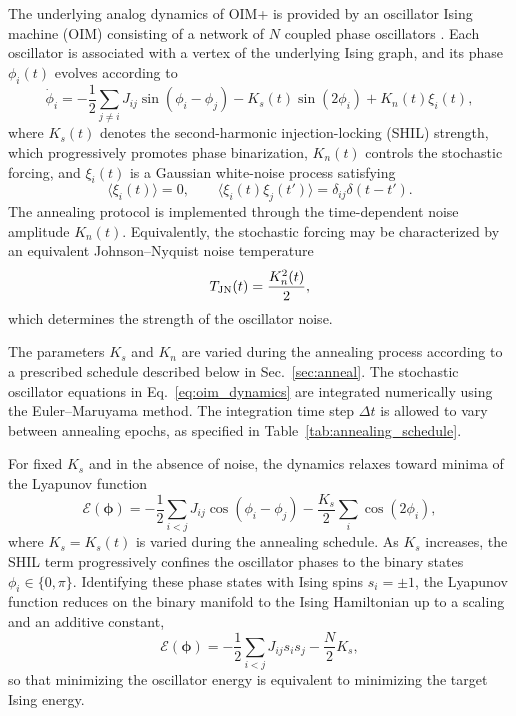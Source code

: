 \documentclass[
reprint,
amsmath,amssymb,
aps,
pre,
floatfix,
]{revtex4-2}
\begin{document}
The underlying analog dynamics of OIM+ is provided by an oscillator Ising machine (OIM) consisting of a network of $N$ coupled phase oscillators \cite{OIM,Neumann}. Each oscillator is associated with a vertex of the underlying Ising graph, and its phase $\phi_i(t)$ evolves according to
\begin{equation}
\dot{\phi}_i =
-
\frac{1}{2}\sum_{j\neq i}
J_{ij}
\sin(\phi_i-\phi_j)
-K_s(t)\sin(2\phi_i)
+K_n(t)\xi_i(t),
\label{eq:oim_dynamics}
\end{equation}
where $K_s(t)$ denotes the second-harmonic injection-locking (SHIL) strength, which progressively promotes phase binarization, $K_n(t)$ controls the stochastic forcing, and $\xi_i(t)$ is a Gaussian white-noise process satisfying
\begin{equation}
\langle \xi_i(t)\rangle =0,
\qquad
\langle \xi_i(t)\xi_j(t')\rangle=
\delta_{ij}\delta(t-t').
\end{equation}
The annealing protocol is implemented through the time-dependent noise amplitude $K_n(t)$. Equivalently, the stochastic forcing may be characterized by an
equivalent Johnson--Nyquist noise temperature
\begin{equation}
\label{eq:Tjn}
T_{\rm JN}(t)
=
\frac{K_n^2(t)}{2},
\end{equation}
which determines the strength of the oscillator noise.

The parameters $K_s$ and $K_n$ are varied during the annealing process according to a prescribed schedule described below in Sec.~\ref{sec:anneal}.
The stochastic oscillator equations in Eq.~\eqref{eq:oim_dynamics} are
integrated numerically using the Euler--Maruyama method.
The integration time step $\Delta t$ is allowed to vary between annealing
epochs, as specified in Table~\ref{tab:annealing_schedule}.

For fixed $K_s$ and in the absence of noise, the dynamics relaxes toward minima of the Lyapunov function
\begin{equation}
\mathcal{E}(\boldsymbol{\phi})
=
-\frac{1}{2}\sum_{i<j}
J_{ij}
\cos(\phi_i-\phi_j)
-\frac{K_s}{2}
\sum_i
\cos(2\phi_i),
\label{eq:lyapunov}
\end{equation}
where $K_s=K_s(t)$ is varied during the annealing schedule.
As $K_s$ increases, the SHIL term progressively confines the oscillator phases to the binary states
$\phi_i\in\lbrace 0,\pi\rbrace$. Identifying these phase states with Ising spins $s_i=\pm1$, the Lyapunov function reduces on the binary manifold to the Ising Hamiltonian up to a scaling and an additive constant,
\begin{equation}
\mathcal{E}(\boldsymbol{\phi})
=
-\frac{1}{2}\sum_{i<j}J_{ij}s_i s_j
-\frac{N}{2}K_s ,
\end{equation}
so that minimizing the oscillator energy is equivalent to minimizing the target Ising energy.
\end{document}

